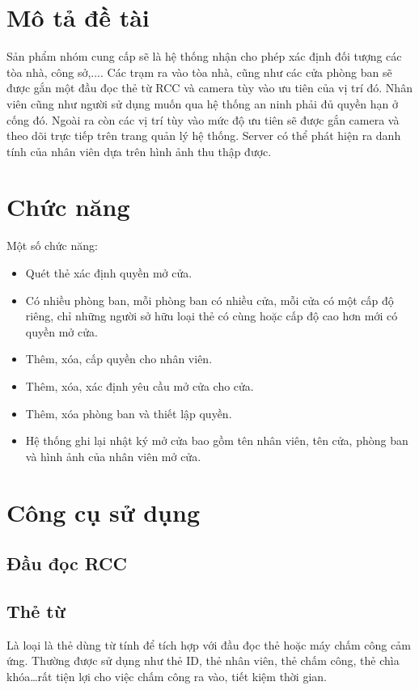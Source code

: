 \documentclass[a4paper]{article}
\begin{document}
\newpage
\tableofcontents
\newpage

\section{Mô tả đề tài}
\hspace{6mm} Sản phẩm nhóm cung cấp sẽ là hệ thống nhận cho phép xác định đối tượng các tòa nhà, công sở,.... Các trạm ra vào tòa nhà, cũng như các cửa phòng ban sẽ được gắn một đầu đọc thẻ từ RCC và camera tùy vào ưu tiên của vị trí đó. Nhân viên cũng như người sử dụng muốn qua hệ thống an ninh phải đủ quyền hạn ở cống đó. Ngoài ra còn các vị trí tùy vào mức độ ưu tiên sẽ được gắn camera và theo dõi trực tiếp trên trang quản lý hệ thống. Server có thể phát hiện ra danh tính của nhân viên dựa trên hình ảnh thu thập được.
\section{Chức năng}
	Một số chức năng:
	\begin{itemize}
		\item Quét thẻ xác định quyền mở cửa.  
		\item Có nhiều phòng ban, mỗi phòng ban có nhiều cửa, mỗi cửa có một cấp độ riêng, chỉ những người sở hữu loại thẻ có cùng hoặc cấp độ cao hơn mới có quyền mở cửa.
		\item Thêm, xóa, cấp quyền cho nhân viên.
		\item Thêm, xóa, xác định yêu cầu mở cửa cho cửa.
		\item Thêm, xóa phòng ban và thiết lập quyền.
		\item Hệ thống ghi lại nhật ký mở cửa bao gồm tên nhân viên, tên cửa, phòng ban và hình ảnh của nhân viên mở cửa.
	\end{itemize}
\section{Công cụ sử dụng}
\subsection{Đầu đọc RCC}
\subsection{Thẻ từ}
\hspace{6mm} Là loại là thẻ dùng từ tính để tích hợp với đầu đọc thẻ hoặc máy chấm công cảm ứng. Thường được sử dụng như thẻ ID, thẻ nhân viên, thẻ chấm công, thẻ chìa khóa…rất tiện lợi cho việc chấm công ra vào, tiết kiệm thời gian.
\end{document}
